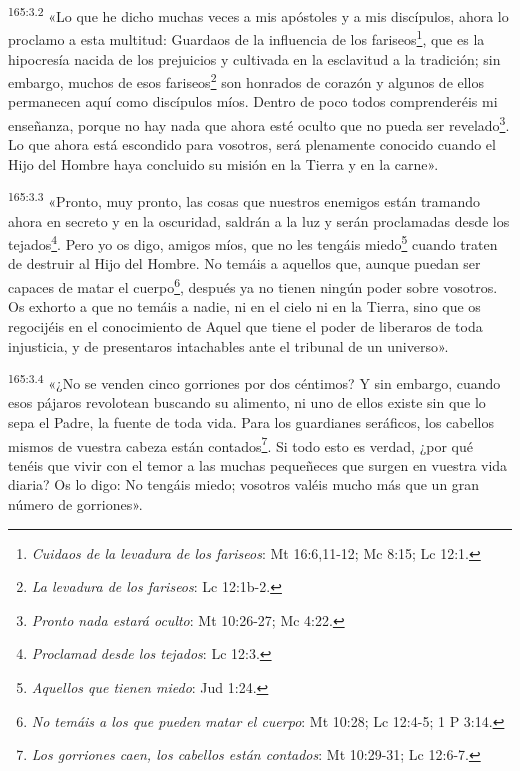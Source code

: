 \par 
\textsuperscript{165:3.2} «Lo que he dicho muchas veces a mis apóstoles y a mis discípulos, ahora lo proclamo a esta multitud: Guardaos de la influencia de los fariseos\footnote{\textit{Cuidaos de la levadura de los fariseos}: Mt 16:6,11-12; Mc 8:15; Lc 12:1.}, que es la hipocresía nacida de los prejuicios y cultivada en la esclavitud a la tradición; sin embargo, muchos de esos fariseos\footnote{\textit{La levadura de los fariseos}: Lc 12:1b-2.} son honrados de corazón y algunos de ellos permanecen aquí como discípulos míos. Dentro de poco todos comprenderéis mi enseñanza, porque no hay nada que ahora esté oculto que no pueda ser revelado\footnote{\textit{Pronto nada estará oculto}: Mt 10:26-27; Mc 4:22.}. Lo que ahora está escondido para vosotros, será plenamente conocido cuando el Hijo del Hombre haya concluido su misión en la Tierra y en la carne».

\par 
\textsuperscript{165:3.3} «Pronto, muy pronto, las cosas que nuestros enemigos están tramando ahora en secreto y en la oscuridad, saldrán a la luz y serán proclamadas desde los tejados\footnote{\textit{Proclamad desde los tejados}: Lc 12:3.}. Pero yo os digo, amigos míos, que no les tengáis miedo\footnote{\textit{Aquellos que tienen miedo}: Jud 1:24.} cuando traten de destruir al Hijo del Hombre. No temáis a aquellos que, aunque puedan ser capaces de matar el cuerpo\footnote{\textit{No temáis a los que pueden matar el cuerpo}: Mt 10:28; Lc 12:4-5; 1 P 3:14.}, después ya no tienen ningún poder sobre vosotros. Os exhorto a que no temáis a nadie, ni en el cielo ni en la Tierra, sino que os regocijéis en el conocimiento de Aquel que tiene el poder de liberaros de toda injusticia, y de presentaros intachables ante el tribunal de un universo».

\par 
\textsuperscript{165:3.4} «¿No se venden cinco gorriones por dos céntimos? Y sin embargo, cuando esos pájaros revolotean buscando su alimento, ni uno de ellos existe sin que lo sepa el Padre, la fuente de toda vida. Para los guardianes seráficos, los cabellos mismos de vuestra cabeza están contados\footnote{\textit{Los gorriones caen, los cabellos están contados}: Mt 10:29-31; Lc 12:6-7.}. Si todo esto es verdad, ¿por qué tenéis que vivir con el temor a las muchas pequeñeces que surgen en vuestra vida diaria? Os lo digo: No tengáis miedo; vosotros valéis mucho más que un gran número de gorriones».

